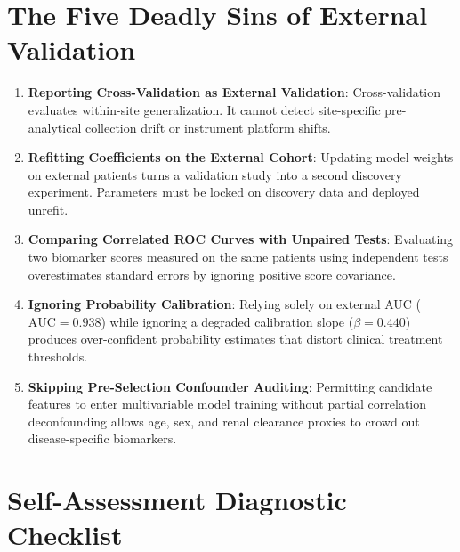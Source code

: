 \documentclass[11pt,twoside,openright]{book}
\begin{document}
\section{The Five Deadly Sins of External Validation}

\begin{enumerate}
    \item \textbf{Reporting Cross-Validation as External Validation}: Cross-validation evaluates within-site generalization. It cannot detect site-specific pre-analytical collection drift or instrument platform shifts.
    \item \textbf{Refitting Coefficients on the External Cohort}: Updating model weights on external patients turns a validation study into a second discovery experiment. Parameters must be locked on discovery data and deployed unrefit.
    \item \textbf{Comparing Correlated ROC Curves with Unpaired Tests}: Evaluating two biomarker scores measured on the same patients using independent tests overestimates standard errors by ignoring positive score covariance.
    \item \textbf{Ignoring Probability Calibration}: Relying solely on external AUC ($\text{AUC} = 0.938$) while ignoring a degraded calibration slope ($\beta = 0.440$) produces over-confident probability estimates that distort clinical treatment thresholds.
    \item \textbf{Skipping Pre-Selection Confounder Auditing}: Permitting candidate features to enter multivariable model training without partial correlation deconfounding allows age, sex, and renal clearance proxies to crowd out disease-specific biomarkers.
\end{enumerate}

\section{Self-Assessment Diagnostic Checklist}
\end{document}
